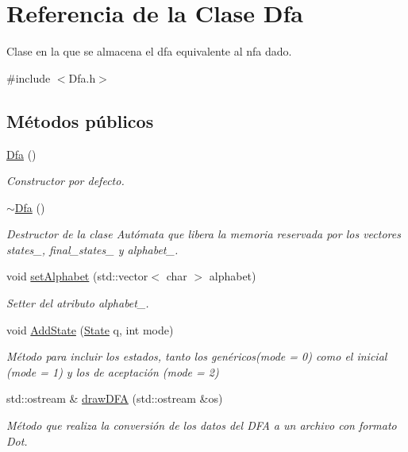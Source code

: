 \hypertarget{classDfa}{}\section{Referencia de la Clase Dfa}
\label{classDfa}


Clase en la que se almacena el dfa equivalente al nfa dado.  




{\ttfamily \#include $<$Dfa.\+h$>$}

\subsection*{Métodos públicos}
\begin{DoxyCompactItemize}
\item 
\mbox{\label{classDfa_a8b4306c41ff0004264f56563e4399992}} 
\hyperlink{classDfa_a8b4306c41ff0004264f56563e4399992}{Dfa} ()
\begin{DoxyCompactList}\small\item\em Constructor por defecto. \end{DoxyCompactList}\item 
\mbox{\label{classDfa_a2d110a2cc46b2dab6e6f9e901639b0cd}} 
\hyperlink{classDfa_a2d110a2cc46b2dab6e6f9e901639b0cd}{$\sim$\+Dfa} ()
\begin{DoxyCompactList}\small\item\em Destructor de la clase Autómata que libera la memoria reservada por los vectores states\+\_\+, final\+\_\+states\+\_\+ y alphabet\+\_\+. \end{DoxyCompactList}\item 
void \hyperlink{classDfa_ac15e207ccc689d4a48b4c5a5fdf21b6c}{set\+Alphabet} (std\+::vector$<$ char $>$ alphabet)
\begin{DoxyCompactList}\small\item\em Setter del atributo alphabet\+\_\+. \end{DoxyCompactList}\item 
void \hyperlink{classDfa_a31436e55ea182f71b9f2b903b18d4ba5}{Add\+State} (\hyperlink{classState}{State} q, int mode)
\begin{DoxyCompactList}\small\item\em Método para incluir los estados, tanto los genéricos(mode = 0) como el inicial (mode = 1) y los de aceptación (mode = 2) \end{DoxyCompactList}\item 
std\+::ostream \& \hyperlink{classDfa_a643ff03f080320dba8d247efb25d70b0}{draw\+D\+FA} (std\+::ostream \&os)
\begin{DoxyCompactList}\small\item\em Método que realiza la conversión de los datos del D\+FA a un archivo con formato Dot. \end{DoxyCompactList}\end{DoxyCompactItemize}


